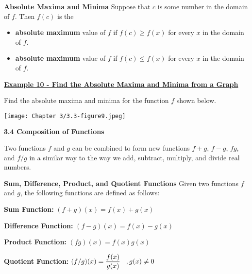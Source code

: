 \documentclass[12pt]{book}
\newcommand{\D}{\displaystyle}
\begin{document}
\begin{boxR}
    \textbf{Absolute Maxima and Minima}
    \vspace{1mm}
    \hline
    \vspace{2mm}
    Suppose that $c$ is some number in the domain of $f$. Then $f(c)$ is the
    \begin{itemize}
        \item \textbf{absolute maximum} value of $f$ if $f(c) \geq f(x)$ for every $x$ in the domain of $f$.
        \item \textbf{absolute maximum} value of $f$ if $f(c) \leq f(x)$ for every $x$ in the domain of $f$.
    \end{itemize}

\end{boxR}

\vspace{5mm}


\underline{\textbf{Example 10 - Find the Absolute Maxima and Minima from a Graph}}

Find the absolute maxima and minima for the function $f$ shown below. 

\texttt{[image: Chapter 3/3.3-figure9.jpeg]}

\newpage


\textbf{{\Large 3.4 Composition of Functions}}
\vspace{3mm}

Two functions $f$ and $g$ can be combined to form new functions $f+g$, $f-g$, $fg$, and $f/g$ in a similar way to the way we add, subtract, multiply, and divide real numbers.

\vspace{5mm}



\begin{boxR}
    \textbf{Sum, Difference, Product, and Quotient Functions}
    \vspace{1mm}
    \hline
    \vspace{2mm}
Given two functions $f$ and $g$, the following functions are defined as follows: 

\vspace{2mm}
\textbf{Sum Function:} $\D (f+g)(x)=f(x) + g(x)$
    \vspace{3mm}
    
\textbf{Difference Function:} $\D (f-g)(x)=f(x) - g(x)$
    \vspace{3mm}
    
\textbf{Product Function:}  $\D (fg)(x) = f(x)g(x)$
    \vspace{3mm}
    
    \textbf{Quotient Function:}
 $\D (f/g)(x) = \frac{f(x)}{g(x)} \hspace{3mm}, g(x)\neq 0$   


\end{boxR}
\end{document}
